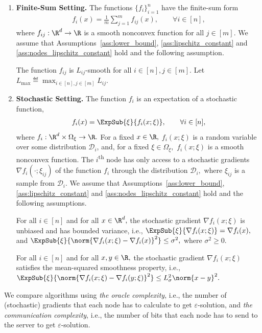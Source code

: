\documentclass{article}
\begin{document}
\begin{enumerate}[leftmargin=0.75cm]
\item \textbf{Finite-Sum Setting.}
The functions $\{f_i\}_{i=1}^n$ have the finite-sum form
\begin{align}
    \label{eq:task_minibatch} f_i(x) = \frac{1}{m}\sum \limits_{j=1}^m f_{ij}(x), \qquad \forall i \in [n],
\end{align}
where $f_{ij} :\R^d  \rightarrow \R$ is a smooth nonconvex  function for all $j \in [m].$
We assume that Assumptions~\ref{ass:lower_bound}, \ref{ass:lipschitz_constant} and \ref{ass:nodes_lipschitz_constant} hold and the following assumption.
\begin{assumption}
  \label{ass:max_lipschitz_constant}
  The function $f_{ij}$ is $L_{ij}$-smooth for all $i \in [n], j \in [m].$ Let $L_{\max} \eqdef \max_{i \in [n], j \in [m]} L_{ij}.$
\end{assumption}
\item \textbf{Stochastic Setting.}
The function $f_i$ is an expectation of a stochastic function, 
\begin{align}
    \label{eq:task_staochastic}
    f_i(x) = \ExpSub{\xi}{f_i(x;\xi)}, \qquad \forall i \in [n],
\end{align}
where $f_i :\R^d \times \Omega_{\xi} \rightarrow \R.$ For a fixed $x \in \R,$ $f_i(x;\xi)$ is a random variable over some distribution $\mathcal{D}_i$,
and, for a fixed $\xi \in \Omega_{\xi},$ $f_i(x;\xi)$ is a smooth nonconvex function.
The $i$\textsuperscript{th} node has only access to a stochastic gradients $\nabla f_i(\cdot; \xi_{ij})$ 
of the function $f_i$ through the distribution $\mathcal{D}_i,$ where $\xi_{ij}$ is a sample from $\mathcal{D}_i.$
We assume that Assumptions~\ref{ass:lower_bound}, \ref{ass:lipschitz_constant} and \ref{ass:nodes_lipschitz_constant} hold and the following assumptions.
\begin{assumption}
  \label{ass:stochastic_unbiased_and_variance_bounded}
  For all $i \in [n]$ and for all $x \in \R^d,$ the stochastic gradient $\nabla f_i(x;\xi)$ is unbiased and has bounded variance, i.e., $\ExpSub{\xi}{\nabla f_i(x;\xi)} = \nabla f_i(x),$ and $\ExpSub{\xi}{\norm{\nabla f_i(x;\xi) - \nabla f_i(x)}^2} \leq \sigma^2,$ where $\sigma^2 \geq 0.$
\end{assumption}
\begin{assumption}
  \label{ass:mean_square_smoothness}
  For all $i \in [n]$ and for all $x, y \in \R,$ the stochastic gradient $\nabla f_i(x;\xi)$ satisfies the mean-squared smoothness property, i.e., $\ExpSub{\xi}{\norm{\nabla f_i(x;\xi) - \nabla f_i(y;\xi)}^2} \leq L_{\sigma}^2 \norm{x - y}^2.$
\end{assumption}
\end{enumerate}
We compare algorithms using \textit{the oracle complexity}, i.e., the number of (stochastic) gradients that each node has to calculate to get $\varepsilon$-solution, and \textit{the communication complexity}, i.e., the number of bits that each node has to send to the server to get $\varepsilon$-solution.
\end{document}
